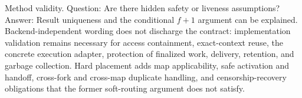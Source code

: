 \documentclass[11pt]{article}
\begin{document}

Method validity. Question: Are there hidden safety or liveness assumptions? Answer: Result uniqueness and the conditional \(f+1\) argument can be explained. Backend-independent wording does not discharge the contract: implementation validation remains necessary for access containment, exact-context reuse, the concrete execution adapter, protection of finalized work, delivery, retention, and garbage collection. Hard placement adds map applicability, safe activation and handoff, cross-fork and cross-map duplicate handling, and censorship-recovery obligations that the former soft-routing argument does not satisfy.



\begingroup\small\raggedright
\setlength{\bibsep}{3pt}

\endgroup
\end{document}
